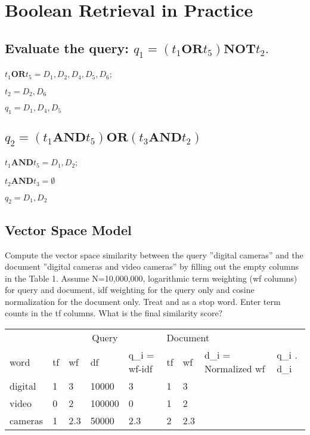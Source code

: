 \documentclass{scrartcl}
\begin{document}
\section{Boolean Retrieval in Practice}

\subsection{Evaluate the query: $q_1 = (t_1    \textbf{OR}    t_5)    \textbf{NOT}   t_2.$ }

$t_1     \textbf{OR}    t_5 = D_1, D_2, D_4, D_5, D_6$;
 
$t_2 = D_2, D_6$

$q_1 = D_1, D_4, D_5$

\subsection{$q_2 = (t_1     \textbf{AND}    t_5)     \textbf{OR}     (t_3     \textbf{AND}    t_2)$}


$t_1     \textbf{AND}    t_5 = D_1, D_2$; 

$t_2     \textbf{AND}    t_3 = \emptyset $

$q_2 = D_1, D_2$

\subsection{ Vector Space Model}

Compute the vector space similarity between the query ”digital cameras” and the document
”digital cameras and video cameras” by filling out the empty columns in the Table 1. Assume
N=10,000,000, logarithmic term weighting (wf columns) for query and document, idf weighting
for the query only and cosine normalization for the document only. Treat and as a stop word.
Enter term counts in the tf columns. What is the final similarity score? 



\begin{table}[]
\centering
\begin{tabular}{lllllllll}
                             & \multicolumn{4}{c}{Query}         & \multicolumn{3}{l}{Document}    &             \\ \cline{2-8}
word                         & tf & wf  & df     & q\_i = wf-idf & tf & wf  & d\_i = Normalized wf & q\_i . d\_i \\ \hline
\multicolumn{1}{l|}{digital} & 1  & 3   & 10000  & 3             & 1  & 3   &                      &             \\
\multicolumn{1}{l|}{video}   & 0  & 2   & 100000 & 0             & 1  & 2   &                      &             \\
\multicolumn{1}{l|}{cameras} & 1  & 2.3 & 50000  & 2.3           & 2  & 2.3 &                      &            
\end{tabular}
\end{table}
\end{document}
